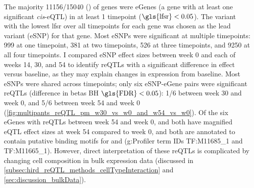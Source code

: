 

The majority \num{11156/15040} () of genes were eGenes (a gene with at least one significant \textit{cis}-\gls{eQTL}) in at least 1 timepoint ($\text{\gls{lfsr}} < 0.05$).
The variant with the lowest \gls{lfsr} over all timepoints for each gene was 
chosen as the lead variant (eSNP) for that gene.
Most eSNPs were significant at multiple timepoints: 
\num{999} at one timepoint, \num{381} at two timepoints, \num{526} at three timepoints, and \num{9250} at all four timepoints.
I compared eSNP effect sizes between week 0 and each of weeks 14, 30, and 54 to identify \glspl{reQTL} with a significant difference in effect versus baseline,
as they may explain changes in expression from baseline.
Most eSNPs were shared across timepoints;
only six eSNP-eGene pairs were significant \glspl{reQTL} (difference in betas \gls{BH} $\text{\gls{FDR}} < 0.05$):
1/6 between week 30 and week 0, and 5/6 between week 54 and week 0 (\cref{fig:multipants_reQTL_pm_w30_vs_w0_and_w54_vs_w0}).
Of the six eGenes with \glspl{reQTL} between week 54 and week 0,  and  both have magnified \gls{eQTL} effect sizes at week 54 compared to week 0,
and both are annotated to contain putative binding motifs for  and  ({g:Profiler} term IDs TF:M11685\_1 and TF:M11665\_1).
However, direct interpretation of these \glspl{reQTL} is complicated by changing cell composition in bulk expression data (discussed in \cref{subsec:hird_reQTL_methods_cellTypeInteraction} and \cref{sec:discussion_bulkData}).


